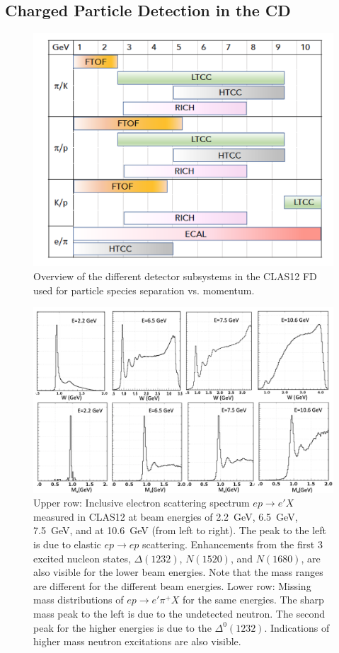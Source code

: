 \documentclass[final,3p,twocolumn]{elsarticle}
\begin{document}
\subsection{Charged Particle Detection in the CD} 
\begin{figure}[htp!]
\centerline{\includegraphics[width=1.0\columnwidth]{CLAS12-pid.png}}
\caption{Overview of the different detector subsystems in the CLAS12 FD used for particle species separation
  vs. momentum.}
\label{pid1}
\end{figure} 

\begin{figure}[t!]
\centerline{\includegraphics[width=2.0\columnwidth]{W-spectrum.png}}
\caption{Upper row: Inclusive electron scattering spectrum $ep \to e' X$ measured in CLAS12 at beam energies 
  of 2.2~GeV, 6.5~GeV, 7.5~GeV, and at 10.6~GeV (from left to right). The peak to the left is due to elastic
  $ep \to ep$ scattering. Enhancements from the first 3 excited nucleon states, $\Delta(1232)$, $N(1520)$,
  and $N(1680)$, are also visible for the lower beam energies. Note that the mass ranges  are different for the
  different beam energies. Lower row: Missing mass distributions of $ep\to e' \pi^+X$ for the same energies. The
  sharp mass peak to the left is due to the undetected neutron. The second peak for the higher energies is due to
  the $\Delta^0(1232)$. Indications of higher mass neutron excitations are also visible.} 
\label{spectrum}
\end{figure} 
\end{document}
